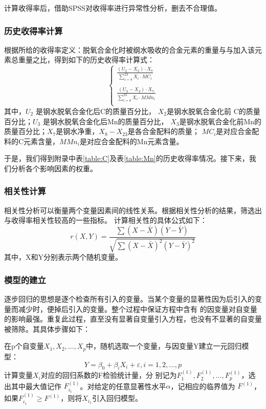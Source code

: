 \documentclass[12pt]{article}%
\begin{document}
计算收得率后，借助SPSS对收得率进行异常性分析，删去不合理值。
\subsubsection{历史收得率计算}
根据所给的收得率定义：脱氧合金化时被纲水吸收的合金元素的重量与与加入该元素总重量之比，得到如下的历史收得率计算式：
\begin{equation}\label{zhuanhualv}
\left\{
             \begin{array}{c}
 \frac{\left(U_{2}-X_{2}\right)\cdot X_7}{\sum^{23}_{i=8}X_i\cdot MC_i}\\
 \\
 \frac{\left(U_{3}-X_{3}\right)\cdot X_7}{\sum^{23}_{i=8}X_i\cdot MMn_i}\\
 \end{array}
\right.
\end{equation}
 其中，$U_2$ 是钢水脱氧合金化后C的质量百分比， $X_{2}$是钢水脱氧合金化前
 C的质量百分比；$U_{3}$ 是钢水脱氧合金化后Mn的质量百分比， $X_{3}$是钢水脱氧合金化前Mn的质量百分比；$X_7$是钢水净重，$X_{8}-X_{23}$是各合金配料的质量； $MC_i$是对应合金配料的C元素含量，$MMn_i$是对应合金配料的Mn元素含量。

 于是，我们得到附录中表\ref{table:C}及表\ref{table:Mn}的历史收得率情况。接下来，我们分析各个影响因素的权重。
\subsubsection{相关性计算}
相关性分析可以衡量两个变量因素间的线性关系\cite{zhubuhuigui2}。根据相关性分析的结果，筛选出与收得率相关性较高的一些指标。
计算相关性的具体公式如下：
\begin{equation}\label{xiangguanxing}
r(X,Y)=\frac{\sum(X-\bar{X})(Y-\bar{Y})}{\sqrt{\sum(X-\bar{X})^2(Y-\bar{Y})^2}}
\end{equation}
其中，X和Y分别表示两个随机变量。
\subsubsection{模型的建立}
逐步回归的思想是逐个检查所有引入的变量。当某个变量的显著性因为后引入的变量而减少时，便掉后引入的变量。整个过程中保证方程中含有
的因变量对自变量的影响最强。重复此过程，直至没有显著自变量引入方程，也没有不显著的自变量被筛除。其具体步骤如下：

在p个自变量$X_1,X_2,\ldots,X_p$中，随机选取一个变量，与因变量Y建立一元回归模型：
\begin{equation}\label{yiyuanhuig}
Y={\beta}_0+{\beta}_i X_i+\varepsilon ,i=1,2,\ldots,p
\end{equation}
计算变量$X_i$对应的回归系数的F检验统计量，分
别记为$F^{(1)}_1,F^{(1)}_2,\ldots,F^{(1)}_p$，选出其中最大值记作
$F^{(1)}_{i_1}$。对给定的任意显著性水平$\alpha$，记相应的临界值为
$F^{(1)}$，如果$F^{(1)}_{i_1}\geq F^{(1)}$，则将$X_{i_1}$引入回归模型。
\end{document}
